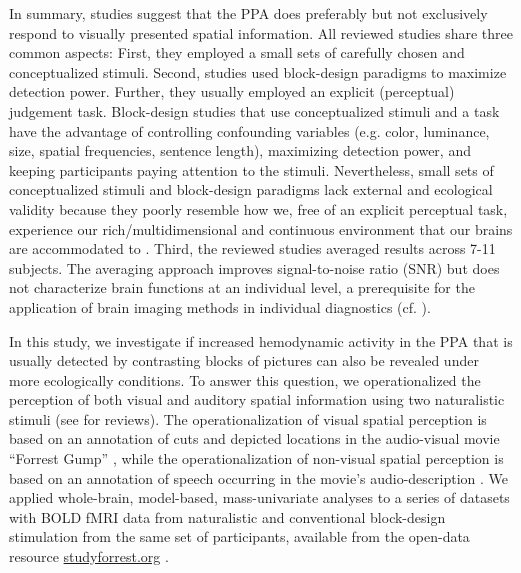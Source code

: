 \documentclass[english]{article}
\begin{document}
In summary, studies suggest that the PPA does preferably but not exclusively
respond to visually presented spatial information.
All reviewed studies share three common aspects:
First, they employed a small sets of carefully chosen and conceptualized
stimuli.
Second, studies used block-design paradigms to maximize detection power.
Further, they usually employed an explicit (perceptual) judgement task.
Block-design studies that use conceptualized stimuli and a task have the
advantage of controlling confounding variables (e.g. color, luminance, size,
spatial frequencies, sentence length), maximizing detection power, and keeping
participants paying attention to the stimuli.
Nevertheless, small sets of conceptualized stimuli and block-design paradigms
lack external and ecological validity \citep{westfall2016fixing,
hasson2004intersubject} because they poorly resemble how we, free of an
explicit perceptual task, experience our rich/multidimensional and continuous
environment that our brains are accommodated to
\citep{sonkusare2019naturalistic}.
Third, the reviewed studies averaged results across 7-11 subjects.
The averaging approach improves signal-to-noise ratio (SNR) but does not
characterize brain functions at an individual level, a prerequisite for the
application of brain imaging methods in individual diagnostics (cf.
\cite{dubois2016building, eickhoff2020towards}).

In this study, we investigate if increased hemodynamic activity in the PPA that
is usually detected by contrasting blocks of pictures can also be revealed under
more ecologically conditions.
To answer this question, we operationalized the perception of both visual and
auditory spatial information using two naturalistic stimuli (see
\citep{hamilton2018revolution, hasson2008neurocinematics,
sonkusare2019naturalistic} for reviews).
The operationalization of visual spatial perception is based on an annotation of
cuts and depicted locations in the audio-visual movie ``Forrest Gump''
\citep{haeusler2016cutanno}, while
the operationalization of non-visual spatial perception is based on an
annotation of speech occurring in the movie's audio-description
\citep{hausler2021studyforrest}.
We applied whole-brain, model-based, mass-univariate analyses to a series of
datasets with BOLD fMRI data from naturalistic and conventional block-design
stimulation from the same set of participants, available from the open-data
resource \href{http://www.studyforrest.org}{studyforrest.org}
\citep{hanke2016simultaneous, hanke2014audiomovie, sengupta2016extension}.
\end{document}
